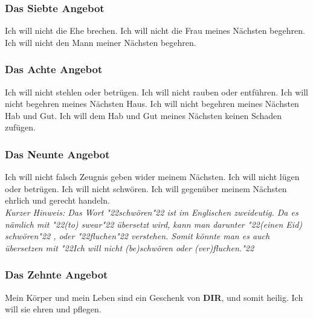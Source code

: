 \documentclass[10pt,a5paper]{article}
\newcommand{\Dir}[0]{\textbf{DIR}}
\newcommand{\q}[1]{\char"22{#1}\char"22 }
\begin{document}
	\subsubsection{Das Siebte Angebot}
		Ich will nicht die Ehe brechen.
		Ich will nicht die Frau meines N\"achsten begehren.
		Ich will nicht den Mann meiner N\"achsten begehren.
		
	\subsubsection{Das Achte Angebot}
		Ich will nicht stehlen oder betr\"ugen.
		Ich will nicht rauben oder entf\"uhren.
		Ich will nicht begehren meines N\"achsten Haus.
		Ich will nicht begehren meines N\"achsten Hab und Gut.
		Ich will dem Hab und Gut meines N\"achsten keinen Schaden zuf\"ugen.
		
	\subsubsection{Das Neunte Angebot} \label{DasNeunteAngebot}
		Ich will nicht falsch Zeugnis geben wider meinem N\"achsten.
		Ich will nicht l\"ugen oder betr\"ugen.
		Ich will nicht schw\"oren.
		Ich will gegen\"uber meinem N\"achsten ehrlich und gerecht handeln.
		\\
		\textit{Kurzer Hinweis:
		Das Wort \q{schw\"oren} ist im Englischen zweideutig.
		Da es n\"amlich mit \q{(to) swear} \"ubersetzt wird,
		kann man darunter \q{(einen Eid) schw\"oren},
		oder \q{fluchen} verstehen.
		Somit k\"onnte man es auch \"ubersetzen mit
		\q{Ich will nicht (be)schw\"oren oder (ver)fluchen.}}
		
	\subsubsection{Das Zehnte Angebot} \label{DasZehnteAngebot}
		Mein K\"orper und mein Leben sind ein Geschenk von {\Dir},
		und somit heilig.
		Ich will sie ehren und pflegen.
	
\end{document}
